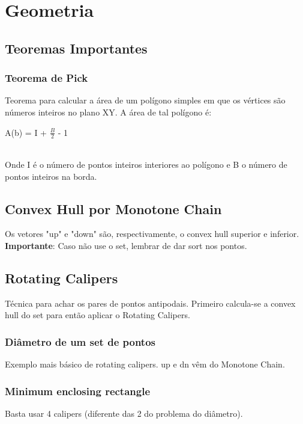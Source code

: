 \section{Geometria}

\subsection{Teoremas Importantes}

\subsubsection{Teorema de Pick}
Teorema para calcular a \'{a}rea de um pol\'{i}gono simples em que os v\'{e}rtices são n\'{u}meros inteiros no plano XY. A \'{a}rea de tal pol\'{i}gono é: 
\\\centerline{A(b) = I + $\frac{B}{2}$ - 1}
\\Onde I \'{e} o n\'{u}mero de pontos inteiros interiores ao pol\'{i}gono e B o n\'{u}mero de pontos inteiros na borda.

\divisor

\subsection{Convex Hull por Monotone Chain}
Os vetores "up" e "down" s\~{a}o, respectivamente, o convex hull superior e inferior.
\\ \textbf{Importante}: Caso n\~{a}o use o set, lembrar de dar sort nos pontos.

\divisor

\subsection{Rotating Calipers}

T\'{e}cnica para achar os pares de pontos antipodais. Primeiro calcula-se a convex hull do set para ent\~{a}o aplicar o Rotating Calipers.

\subsubsection{Di\^{a}metro de um set de pontos}
Exemplo mais b\'{a}sico de rotating calipers. up e dn v\^{e}m do Monotone Chain.
\divisor

\subsubsection{Minimum enclosing rectangle}
Basta usar 4 calipers (diferente das 2 do problema do di\^{a}metro).
\divisor

